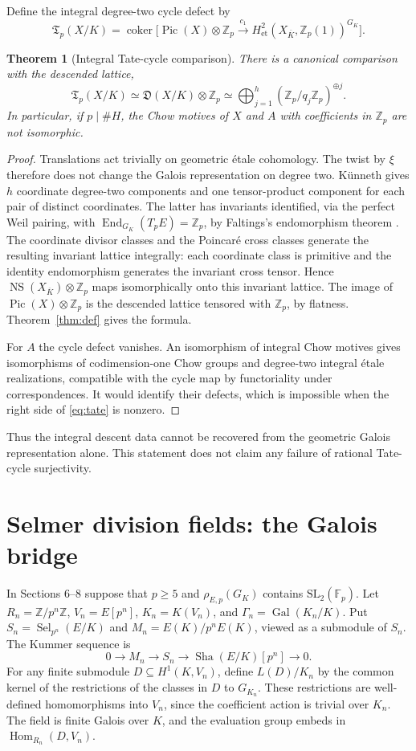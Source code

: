 \documentclass[11pt,a4paper]{article}
\newtheorem{theorem}{Theorem}[section]
\theoremstyle{definition}\newtheorem{definition}[theorem]{Definition}
\theoremstyle{remark}\newtheorem{remark}[theorem]{Remark}
\newcommand{\Sha}{\operatorname{\mathrm{Sha}}}
\newcommand{\ZZ}{\mathbb Z}\newcommand{\QQ}{\mathbb Q}\newcommand{\FF}{\mathbb F}
\newcommand{\Gal}{\operatorname{Gal}}\newcommand{\Hom}{\operatorname{Hom}}\newcommand{\End}{\operatorname{End}}\newcommand{\Pic}{\operatorname{Pic}}\newcommand{\NS}{\operatorname{NS}}\newcommand{\Br}{\operatorname{Br}}\newcommand{\Sel}{\operatorname{Sel}}\newcommand{\ord}{\operatorname{ord}}\newcommand{\rk}{\operatorname{rank}}\newcommand{\corank}{\operatorname{corank}}\newcommand{\length}{\operatorname{length}}\newcommand{\Sym}{\operatorname{Sym}}\newcommand{\Cl}{\operatorname{Cl}}\newcommand{\coker}{\operatorname{coker}}\newcommand{\I}{\mathfrak I}\newcommand{\D}{\mathfrak D}\newcommand{\Tdef}{\mathfrak T}
\numberwithin{equation}{section}
\begin{document}
Define the integral degree-two cycle defect by
\[
\Tdef_p(X/K)=\coker\bigl[\Pic(X)\otimes\ZZ_p\xrightarrow{c_1}
H^2_{\mathrm{et}}(X_{\overline K},\ZZ_p(1))^{G_K}\bigr].
\]
\begin{theorem}[Integral Tate-cycle comparison]\label{thm:tate}
There is a canonical comparison with the descended lattice,
\begin{equation}\label{eq:tate}
\Tdef_p(X/K)\simeq\D(X/K)\otimes\ZZ_p
\simeq\bigoplus_{j=1}^h(\ZZ_p/q_j\ZZ_p)^{\oplus j}.
\end{equation}
In particular, if $p\mid\#H$, the Chow motives of $X$ and $A$ with coefficients in $\ZZ_p$ are not isomorphic.
\end{theorem}
\begin{proof}
Translations act trivially on geometric \'etale cohomology. The twist by $\xi$ therefore does not change the Galois representation on degree two. K\"unneth gives $h$ coordinate degree-two components and one tensor-product component for each pair of distinct coordinates. The latter has invariants identified, via the perfect Weil pairing, with $\End_{G_K}(T_pE)=\ZZ_p$, by Faltings's endomorphism theorem \cite{Faltings}. The coordinate divisor classes and the Poincar\'{e} cross classes generate the resulting invariant lattice integrally: each coordinate class is primitive and the identity endomorphism generates the invariant cross tensor. Hence $\NS(X_{\overline K})\otimes\ZZ_p$ maps isomorphically onto this invariant lattice. The image of $\Pic(X)\otimes\ZZ_p$ is the descended lattice tensored with $\ZZ_p$, by flatness. Theorem~\ref{thm:def} gives the formula.

For $A$ the cycle defect vanishes. An isomorphism of integral Chow motives gives isomorphisms of codimension-one Chow groups and degree-two integral \'etale realizations, compatible with the cycle map by functoriality under correspondences. It would identify their defects, which is impossible when the right side of \eqref{eq:tate} is nonzero.
\end{proof}
Thus the integral descent data cannot be recovered from the geometric Galois representation alone. This statement does not claim any failure of rational Tate-cycle surjectivity.

\section{Selmer division fields: the Galois bridge}
In Sections 6--8 suppose that $p\geq5$ and $\rho_{E,p}(G_K)$ contains $\mathrm{SL}_2(\FF_p)$. Let $R_n=\ZZ/p^n\ZZ$, $V_n=E[p^n]$, $K_n=K(V_n)$, and $\Gamma_n=\Gal(K_n/K)$. Put $S_n=\Sel_{p^n}(E/K)$ and $M_n=E(K)/p^nE(K)$, viewed as a submodule of $S_n$. The Kummer sequence is
\begin{equation}\label{eq:kummer}
0\longrightarrow M_n\longrightarrow S_n\longrightarrow\Sha(E/K)[p^n]\longrightarrow0.
\end{equation}
For any finite submodule $D\subseteq H^1(K,V_n)$, define $L(D)/K_n$ by the common kernel of the restrictions of the classes in $D$ to $G_{K_n}$. These restrictions are well-defined homomorphisms into $V_n$, since the coefficient action is trivial over $K_n$. The field is finite Galois over $K$, and the evaluation group embeds in $\Hom_{R_n}(D,V_n)$.
\end{document}
